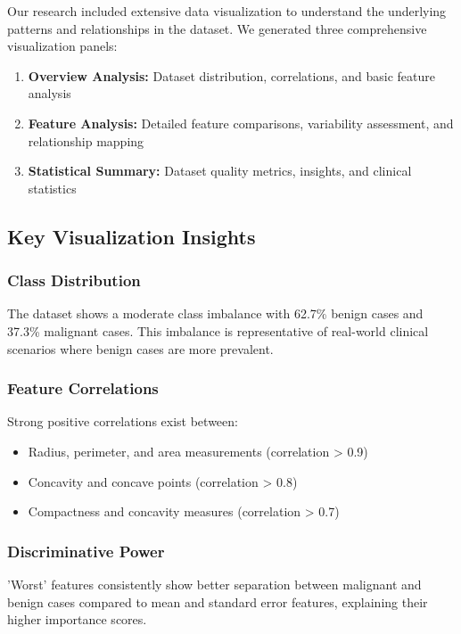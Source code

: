 \documentclass[12pt,a4paper]{article}
\begin{document}
Our research included extensive data visualization to understand the underlying patterns and relationships in the dataset. We generated three comprehensive visualization panels:

\begin{enumerate}
    \item \textbf{Overview Analysis:} Dataset distribution, correlations, and basic feature analysis
    \item \textbf{Feature Analysis:} Detailed feature comparisons, variability assessment, and relationship mapping
    \item \textbf{Statistical Summary:} Dataset quality metrics, insights, and clinical statistics
\end{enumerate}

\subsection{Key Visualization Insights}

\subsubsection{Class Distribution}
The dataset shows a moderate class imbalance with 62.7\% benign cases and 37.3\% malignant cases. This imbalance is representative of real-world clinical scenarios where benign cases are more prevalent.

\subsubsection{Feature Correlations}
Strong positive correlations exist between:
\begin{itemize}
    \item Radius, perimeter, and area measurements (correlation > 0.9)
    \item Concavity and concave points (correlation > 0.8)
    \item Compactness and concavity measures (correlation > 0.7)
\end{itemize}

\subsubsection{Discriminative Power}
'Worst' features consistently show better separation between malignant and benign cases compared to mean and standard error features, explaining their higher importance scores.
\end{document}
